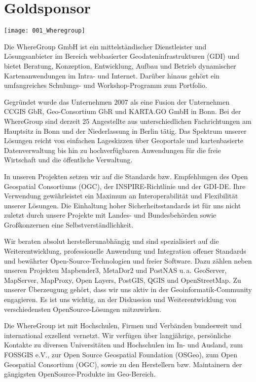 \section*{Goldsponsor}
\begin{center}
	\texttt{[image: 001\_Wheregroup]}
\end{center}
Die WhereGroup GmbH ist ein mittelständischer Dienst\-leister und Lösungsanbieter im Bereich 
webbasierter Geodateninfrastrukturen (GDI) und bietet Beratung, Konzeption, Entwicklung, 
Aufbau und Betrieb dynamischer Kartenanwendungen im Intra- und Internet. Da\-rüber 
hinaus gehört ein umfangreiches Schulungs- und Workshop-Pro\-gramm zum Portfolio.

Gegründet wurde das Unternehmen 2007 als eine Fusion der Unternehmen CCGIS GbR, 
Geo-Consortium GbR und KARTA.GO GmbH in Bonn. Bei der WhereGroup sind derzeit 25 
Angestellte aus unterschiedlichen Fachrichtungen am Hauptsitz in Bonn und der Niederlassung in Berlin tätig. 
Das Spektrum unserer Lösungen reicht von einfachen Lageskizzen über Geoportale und 
kartenbasierte Datenverwaltung bis hin zu hochverfügbaren Anwendungen für die freie 
Wirtschaft und die öffentliche Verwaltung. 

In unseren Projekten setzen wir auf die Standards bzw. Empfehlungen des Open Geospatial 
Consortiums (OGC), der INSPIRE-Richtlinie und der GDI-DE. Ihre Verwendung gewährleistet 
ein Maximum an Interoperabilität und Flexibilität unserer Lösungen. Die Einhaltung hoher 
Sicherheitsstandards ist für uns nicht zuletzt durch unsere Projekte mit Landes- und 
Bundesbehörden sowie Großkonzernen eine Selbstverständlichkeit.

Wir beraten absolut herstellerunabhängig und sind spe\-zialisiert auf die Weiter\-ent\-wicklung, professionelle Anwendung 
und Integration offener Standards und bewährter Open-Source-Technologien und 
freier Software. Dazu zäh\-len neben unseren Projekten Mapbender3, MetaDor2 und PostNAS u.\,a. 
GeoServer, MapServer, Map\-Proxy, Open Layers, PostGIS, QGIS und OpenStreetMap.
Zu unserer Überzeugung gehört, dass wir uns aktiv in der Geoinfor\-matik-Community engagieren. 
Es ist uns wichtig, an der Diskussion und Weiterentwicklung von verschiedensten OpenSource-Lösungen mitzuwirken.

Die WhereGroup ist mit Hochschulen, Firmen und Verbänden bundesweit und international exzellent 
vernetzt. Wir verfügen über langjährige, persönliche Kontakte zu diversen Universitäten und 
Hochschulen im In- und Ausland, zum FOSSGIS e.V., zur Open Source Geospatial Foundation (OSGeo), 
zum Open Geospatial Consortium (OGC), sowie zu den Herstellern bzw. Maintainern der gängigsten 
OpenSource-Produkte im Geo-Bereich.
